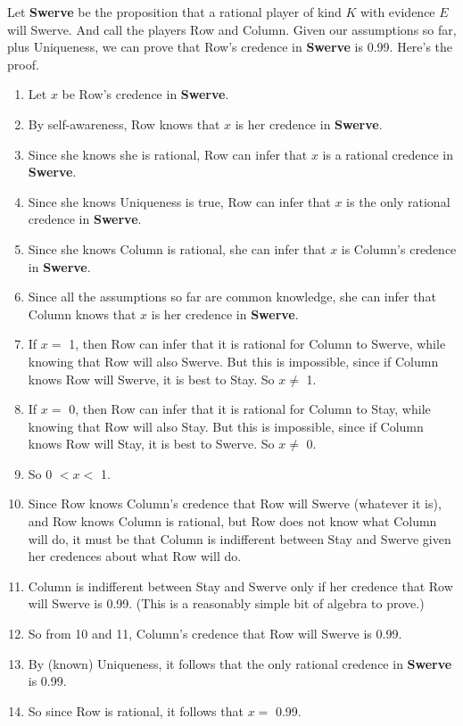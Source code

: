 \documentclass[
  11pt,
]{article}
\providecommand{\tightlist}{%
  \setlength{\itemsep}{0pt}\setlength{\parskip}{0pt}}
\begin{document}
Let \textbf{Swerve} be the proposition that a rational player of kind \(K\) with evidence \(E\) will Swerve. And call the players Row and Column. Given our assumptions so far, plus Uniqueness, we can prove that Row's credence in \textbf{Swerve} is 0.99. Here's the proof.

\begin{enumerate}
\def\labelenumi{\arabic{enumi}.}
\tightlist
\item
  Let \(x\) be Row's credence in \textbf{Swerve}.
\item
  By self-awareness, Row knows that \(x\) is her credence in \textbf{Swerve}.
\item
  Since she knows she is rational, Row can infer that \(x\) is a rational credence in \textbf{Swerve}.
\item
  Since she knows Uniqueness is true, Row can infer that \(x\) is the only rational credence in \textbf{Swerve}.
\item
  Since she knows Column is rational, she can infer that \(x\) is Column's credence in \textbf{Swerve}.
\item
  Since all the assumptions so far are common knowledge, she can infer that Column knows that \(x\) is her credence in \textbf{Swerve}.
\item
  If \(x =\) 1, then Row can infer that it is rational for Column to Swerve, while knowing that Row will also Swerve. But this is impossible, since if Column knows Row will Swerve, it is best to Stay. So \(x \neq\) 1.
\item
  If \(x =\) 0, then Row can infer that it is rational for Column to Stay, while knowing that Row will also Stay. But this is impossible, since if Column knows Row will Stay, it is best to Swerve. So \(x \neq\) 0.
\item
  So 0 \(< x <\) 1.
\item
  Since Row knows Column's credence that Row will Swerve (whatever it is), and Row knows Column is rational, but Row does not know what Column will do, it must be that Column is indifferent between Stay and Swerve given her credences about what Row will do.
\item
  Column is indifferent between Stay and Swerve only if her credence that Row will Swerve is 0.99. (This is a reasonably simple bit of algebra to prove.)
\item
  So from 10 and 11, Column's credence that Row will Swerve is 0.99.
\item
  By (known) Uniqueness, it follows that the only rational credence in \textbf{Swerve} is 0.99.
\item
  So since Row is rational, it follows that \(x =\) 0.99.
\end{enumerate}
\end{document}
